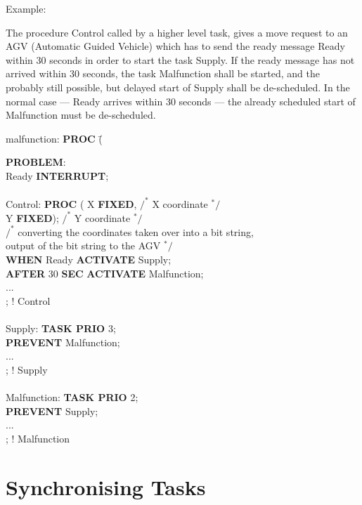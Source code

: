 Example:

The procedure Control called by a higher level task, gives a move
request to an AGV (Automatic Guided Vehicle) which has to send the ready message Ready within
30 seconds in order to start the task Supply. If the ready message has not
arrived within 30 seconds, the task Malfunction shall be started, and
the probably still possible, but delayed start of Supply shall be
de-scheduled. In the normal case --- Ready arrives within 30 seconds
--- the already scheduled start of Malfunction must be de-scheduled.

\begin{tabbing}
\x malfunction: \= {\bf PROC} (\= \kill

{\bf PROBLEM}: \> \> \\
 \> Ready {\bf INTERRUPT}; \> \\
   \> \> \\
\x Control:      \> {\bf PROC} (\> X {\bf FIXED},  $/^*$ X coordinate $^*/$ \\
   \>             \> Y {\bf FIXED}); $/^*$ Y coordinate $^*/$ \\
   \> $/^*$ converting the coordinates taken over into a bit string, \> \\
   \> output of the bit string to the AGV $^*/$ \> \\
   \> {\bf WHEN} Ready {\bf ACTIVATE} Supply; \> \\
   \> {\bf AFTER} 30 {\bf SEC} {\bf ACTIVATE} Malfunction; \> \\
   \> ... \> \\
\x {}; \> ! Control \> \\
   \> \> \\
\x Supply:       \> {\bf TASK PRIO} 3; \> \\
   \> {\bf PREVENT} Malfunction; \> \\
   \> ... \> \\
\x {}; \> ! Supply \> \\
   \> \> \\
\x Malfunction:  \> {\bf TASK PRIO} 2; \> \\
   \> {\bf PREVENT} Supply; \> \\
   \> ... \> \\
\x {}; \> ! Malfunction \>
\end{tabbing}

\section{Synchronising Tasks}    %


